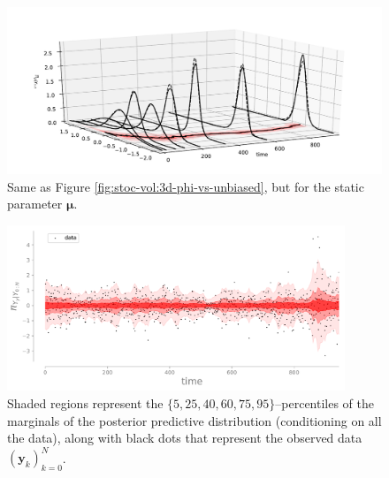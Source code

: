 \documentclass[twoside,11pt]{article}
\newcommand{\yb}{\boldsymbol{y}}
\newcommand{\mub}{\boldsymbol{\mu}}
\begin{document}
\begin{figure}[H]%
  \begin{center}
        \includegraphics[width=1.0\textwidth, bb=65bp 0bp 650bp 290bp, clip]{filtering-marginals-timesteps_mu-3d.pdf}   
    \caption{
    Same as Figure \ref{fig:stoc-vol:3d-phi-vs-unbiased},  but for the static parameter $\mub$.
    }
  \label{fig:stoc-vol:3d-mu-vs-unbiased}   
  \end{center}
\end{figure}

%
%
%
%
%
%
%
%
%
%
%
%
%
%
%
%
%


%
%
%
%
%
%
%
%
%
%
%
%
%
%
%
%
%
%
%
%
%
%
%
%
%
%
%
%
%
%
%
%
%
%
%
%

%
%
%
%
%
%
%
%
%
%
%
%
%
%
%
%
%
%
%
%
%
%

%
%
%
%
%
%
%
%
%
%
%


%

\begin{figure}[H] %
  \begin{center}
        \includegraphics[width=0.90\textwidth, bb=25bp 0bp 650bp 281bp, clip]{posterior-data-predictive.pdf}   
    \caption{ %
     Shaded regions represent the $\{5,25,40,60,75,95\}$--percentiles of the
     marginals of the
     posterior predictive distribution (conditioning on all the data),
     along with
     black dots that represent the observed data $(\yb_k)_{k=0}^N$.
      }
    \label{fig:stoc-vol:post-pred} 
  \end{center}
\end{figure}
\end{document}
